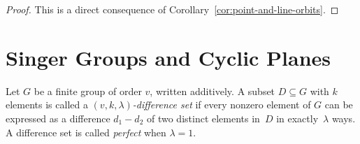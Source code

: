 \begin{proof}
    This is a direct consequence of Corollary~\ref{cor:point-and-line-orbits}.
\end{proof}

\section{Singer Groups and Cyclic Planes}

\begin{defn}
    Let\/ $G$ be a finite group of order\/ $v$, written additively. A subset\/ $D\subseteq G$ with\/ $k$ elements is called a\/ \textsl{$(v,k,\lambda)$-difference set} if every nonzero element of\/ $G$ can be expressed as a difference\/ $d_1 - d_2$ of two distinct elements in\/~$D$ in exactly\/~$\lambda$ ways. A difference set is called \textsl{perfect} when\/ $\lambda = 1$.
\end{defn}

